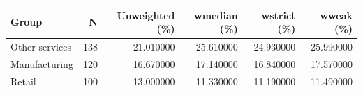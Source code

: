 \begin{tabular}{lrrrrr}
\toprule
Group & N & Unweighted (\%) & wmedian (\%) & wstrict (\%) & wweak (\%) \\
\midrule
Other services & 138 & 21.010000 & 25.610000 & 24.930000 & 25.990000 \\
Manufacturing & 120 & 16.670000 & 17.140000 & 16.840000 & 17.570000 \\
Retail & 100 & 13.000000 & 11.330000 & 11.190000 & 11.490000 \\
\bottomrule
\end{tabular}
